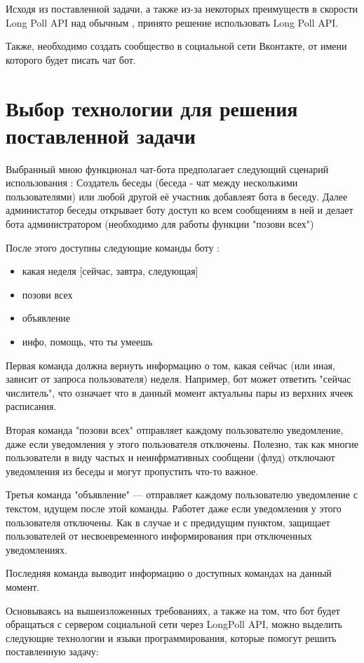 \documentclass[bachelor, och, coursework, times]{SCWorks}
\begin{document}
Исходя из поставленной задачи, а также из-за некоторых преимуществ в скорости Long Poll API над обычным \cite{LongPoll}, принято решение использовать Long Poll API.

Также, необходимо создать сообщество в социальной сети Вконтакте, от имени которого будет писать чат бот.

\section{Выбор технологии для решения поставленной задачи}
Выбранный мною функционал чат-бота предполагает следующий сценарий использования :
Создатель беседы (беседа - чат между несколькими пользователями) или любой другой её участник добавлеят бота в беседу.
Далее администатор беседы открывает боту доступ ко всем сообщениям в ней и делает бота администратором 
(необходимо для работы функции "позови всех")

После этого доступны следующие команды боту :
\begin{itemize}
  \item какая неделя [сейчас, завтра, следующая]
  \item позови всех
  \item объявление
  \item инфо, помощь, что ты умеешь
\end{itemize}

Первая команда должна вернуть информацию о том,
какая сейчас (или иная, зависит от запроса пользователя) неделя.
Например, бот может ответить "сейчас числитель",
что означает что в данный момент актуальны пары из верхних ячеек расписания.

Вторая команда "позови всех" отправляет каждому пользователю уведомление,
даже если уведомления у этого пользователя отключены. Полезно, так как многие пользователи в виду
частых и неинфрмативных сообщени (флуд) отключают уведомления из беседы и могут пропустить что-то важное.

Третья команда "объявление" --- отправляет каждому пользователю уведомление с текстом, идущем после этой команды.
Работет даже если уведомления у этого пользователя отключены. Как в случае и с предидущим пунктом,
защищает пользователей от несвоевременного информирования при отключенных уведомлениях.

Последняя команда выводит информацию о доступных командах на данный момент.

Основываясь на вышеизложенных требованиях, а также на том, что бот будет обращаться
с сервером социальной сети через LongPoll API, можно выделить следующие технологии и языки
программирования, которые помогут решить поставленную задачу:
\end{document}
